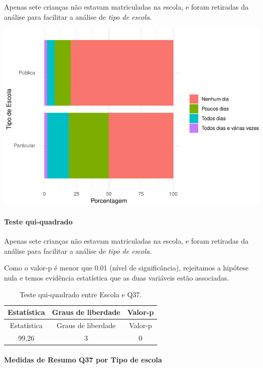 \documentclass[]{article}
\let\oldparagraph\paragraph
\renewcommand{\paragraph}[1]{\oldparagraph{#1}\mbox{}}
\begin{document}
Apenas sete crianças não estavam matriculadas na escola, e foram retiradas da análise para facilitar a análise de \emph{tipo de escola}.

\begin{center}\includegraphics[width=0.75\linewidth]{relatorio_covid19_files/figure-latex/unnamed-chunk-1411-1} \end{center}

\hypertarget{teste-qui-quadrado-121}{%
\paragraph{Teste qui-quadrado}\label{teste-qui-quadrado-121}}

Apenas sete crianças não estavam matriculadas na escola, e foram retiradas da análise para facilitar a análise de \emph{tipo de escola}.

Como o valor-p é menor que 0.01 (nível de significância), rejeitamos a hipótese nula e temos evidência estatística que as duas variáveis estão associadas.

\begin{longtable}[]{@{}ccc@{}}
\caption{\label{tab:unnamed-chunk-1413}Teste qui-quadrado entre Escola e Q37.}\tabularnewline
\toprule
Estatística & Graus de liberdade & Valor-p\tabularnewline
\midrule
\endfirsthead
\toprule
Estatística & Graus de liberdade & Valor-p\tabularnewline
\midrule
\endhead
99,26 & 3 & 0\tabularnewline
\bottomrule
\end{longtable}

\cleardoublepage

\hypertarget{medidas-de-resumo-q37-por-tipo-de-escola}{%
\paragraph{Medidas de Resumo Q37 por Tipo de escola}\label{medidas-de-resumo-q37-por-tipo-de-escola}}
\end{document}
